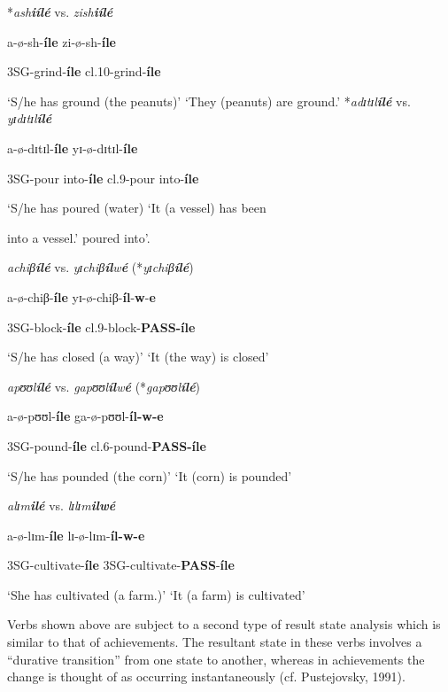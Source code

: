 \documentclass[output=paper,newtxmath,modfonts,nonflat,draftmode]{langsci/langscibook}
\begin{document}
\ea \label{ex:kanijo:28}
\ea
*\textit{ash}\textbf{\textit{iílé}}       vs.  \textit{zish}\textbf{\textit{iílé}}

\textbf{ }a-ø-sh-\textbf{íle}         zi-ø-sh-\textbf{íle}

 3SG-grind-\textbf{íle}      cl.10-grind-\textbf{íle}

 ‘S/he has ground (the peanuts)’  ‘They (peanuts) are ground.’
\ex
*\textit{adɪ}\textit{tɪ}\textit{l}\textbf{\textit{ílé}}       vs.  \textit{yɪ}\textit{dɪ}\textit{tɪ}\textit{l}\textbf{\textit{ílé}}

a-ø-dɪtɪl-\textbf{íle}      yɪ-ø-dɪtɪl-\textbf{íle}

3SG-pour into-\textbf{íle}    cl.9-pour into-\textbf{íle}


‘S/he has poured (water)   ‘It (a vessel) has been


                 into a vessel.’       poured into’.

\ex
\textit{achiβ}\textbf{\textit{ílé}}      vs.  \textit{y}\textit{ɪchiβ}\textbf{\textit{íl}}\textit{w}\textbf{\textit{é}} (*\textit{yɪ}\textit{chiβ}\textbf{\textit{ílé}})

    a-ø-chiβ-\textbf{íle}      yɪ-ø-chiβ-\textbf{íl}-\textbf{w}-\textbf{e}

    3SG-block-\textbf{íle}      cl.9-block-\textbf{PASS-íle}

    ‘S/he has closed (a way)’  ‘It (the way) is closed’

\ex *\textit{ap}\textit{ʊʊl}\textbf{\textit{ílé}}       vs.  \textit{gap}\textit{ʊʊl}\textbf{\textit{íl}}\textit{w}\textbf{\textit{é}} (*\textit{gap}\textit{ʊʊl}\textbf{\textit{ílé}})

    a-ø-pʊʊl-\textbf{íle}      ga-ø-pʊʊl-\textbf{íl-w-e}

    3SG-pound-\textbf{íle}      cl.6-pound-\textbf{PASS-íle}

    ‘S/he has pounded (the corn)’  ‘It (corn) is pounded’

\ex *\textit{alɪ}\textit{m}\textbf{\textit{ilé}}      vs.  \textit{lɪ}\textit{lɪ}\textit{m}\textbf{\textit{ilwé}}

a-ø-lɪm-\textbf{íle}        lɪ-ø-lɪm-\textbf{íl-w-e}

3SG-cultivate-\textbf{íle}      3SG-cultivate-\textbf{PASS}-\textbf{íle}

‘She has cultivated (a farm.)’  ‘It (a farm) is cultivated’
\z
\z

Verbs shown above are subject to a second type of result state analysis which is similar to that of achievements. The resultant state in these verbs involves a “durative transition” from one state to another, whereas in achievements the change is thought of as occurring instantaneously (cf. Pustejovsky, 1991).
\end{document}
